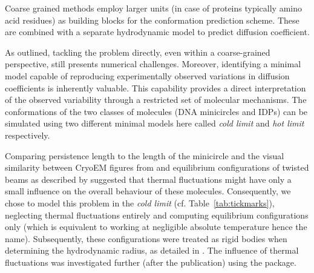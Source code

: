 \documentclass{doctoral}
\newcommand{\code}[1]{\texttt{\detokenize{#1}}}
\begin{document}
Coarse grained methods employ larger units (in case of proteins typically amino acid residues) as building blocks for the conformation prediction scheme.
These are combined with a separate hydrodynamic model to predict diffusion coefficient.

As outlined, tackling the problem directly, even within a coarse-grained perspective, still presents numerical challenges.
Moreover, identifying a minimal model capable of reproducing experimentally observed variations in diffusion coefficients is inherently valuable.
This capability provides a direct interpretation of the observed variability through a restricted set of molecular mechanisms.
The conformations of the two classes of molecules (DNA minicircles and IDPs) can be simulated using two different minimal models here called \emph{cold limit} and \emph{hot limit} respectively.

Comparing persistence length to the length of the minicircle and the visual similarity between CryoEM figures from \textcite{Irobalieva_2015} and equilibrium configurations of twisted beams as described by \textcite{Coleman_2000} suggested that thermal fluctuations might have only a small influence on the overall behaviour of these molecules.
Consequently, we chose to model this problem in the \emph{cold limit} (cf.
Table~\ref{tab:tickmarks}), neglecting thermal fluctuations entirely and computing equilibrium configurations only (which is equivalent to working at negligible absolute temperature hence the name).
Subsequently, these configurations were treated as rigid bodies when determining the hydrodynamic radius, as detailed in \textcite{Waszkiewicz_2023_dna}.
The influence of thermal fluctuations was investigated further (after the publication) using the \code{pychastic} package.
\end{document}
